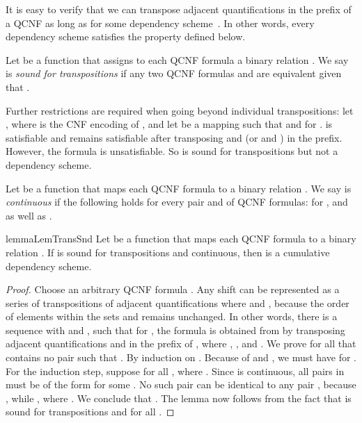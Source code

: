\documentclass{llncs}
\newcommand{\longversion}[1]{#1}
\newcommand{\shortversion}[1]{}
\begin{document}
It is easy to verify that we can transpose adjacent quantifications
 in the prefix of a QCNF  as long as  for some dependency scheme~. In other words, every
dependency scheme satisfies the property defined below.
\begin{definition}
  \label{def:transsnd} Let  be a function that assigns to each QCNF formula
   a binary relation . We say  is
  \emph{sound for transpositions} if any two QCNF formulas \hskip 0pt\hskip 0pt and
  \hskip 0pt\hskip 0pt\hskip 0pt are equivalent given
  that .
\end{definition}
Further restrictions are required when going beyond individual transpositions:
let , where  is the CNF encoding
of , and let  be a mapping such that
 and  for .  is satisfiable and remains satisfiable after transposing  and
 (or  and ) in the prefix. However, the formula  is unsatisfiable. So  is
sound for transpositions but not a dependency scheme.
\begin{definition}[Continuous]
  \label{def:cont} Let  be a function that maps each QCNF formula  to
  a binary relation . We say  is
  \emph{continuous} if the following holds for every pair \hskip 0pt\hskip 0pt and \hskip 0pt\hskip 0pt\hskip 0pt of QCNF formulas:
   for , and  as well as
  .
\end{definition}
\begin{restatable}{lemma}{LemTransSnd} \label{lem:transsnd}\shortversion{\textup{()}}
  Let  be a function that maps each QCNF formula  to a binary
  relation . If  is sound for transpositions
  and continuous, then  is a cumulative dependency scheme.
\end{restatable}
\longversion{\shortversion{\begin{sloppypar}}
\begin{proof} Choose an arbitrary QCNF formula . Any shift
   can be represented as a series of
  transpositions of adjacent quantifications 
  where  and , because the order
  of elements within the sets  and  remains unchanged. In other words, there is a sequence
   with  and , such that for , the formula  is obtained from  by transposing
  adjacent quantifications  and 
  in the prefix of , where , , and . We
  prove for all  that  contains no pair
   such that . By induction on . Because of
   and , we must have  for . For the
  induction step, suppose  for all , where . Since  is continuous, all
  pairs in  must be of the form  for some . No such pair can be identical to any
  pair , because , while , where . We conclude that .  The lemma now follows from the fact that  is sound for
  transpositions and  for all .
\end{proof}
\shortversion{\end{sloppypar}}
 }
\end{document}
